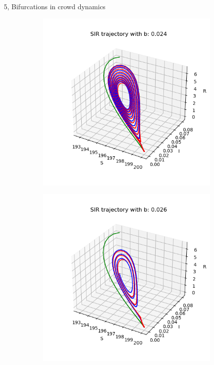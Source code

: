 \documentclass[10pt,a4paper]{article}
\begin{document}
\begin{task}{5, Bifurcations in crowd dynamics }
\begin{figure} [H]
\begin{subfigure} {0.33\textwidth}
\end{subfigure}
\medskip
\begin{subfigure} {0.33\textwidth}
    \centering
    \label{task5-3-7}
    \includegraphics[width=.9\linewidth]{images/0.024.png} 
\end{subfigure}
\begin{subfigure} {0.33\textwidth}
    \centering
    \label{task5-3-8}
    \includegraphics[width=.9\linewidth]{images/0.026.png} 

\end{subfigure}
\end{figure}
\end{task}
\end{document}
